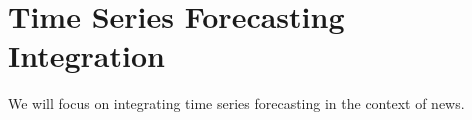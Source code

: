\section{Time Series Forecasting Integration}
\label{sec:integration-with-time-series-forecasting-for-market-trends}
We will focus on integrating time series forecasting in the context of news.

